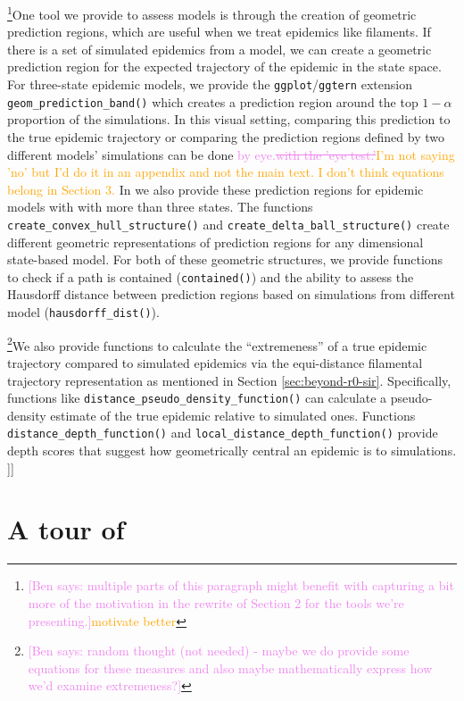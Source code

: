 \documentclass[
  shortnames]{jss}
\begin{document}
\footnote{\textcolor{violet}{[Ben says: multiple parts of this paragraph might benefit with capturing a bit more of the motivation in the rewrite of Section 2 for the tools we're presenting.]}\textcolor{orange}{motivate better}}One
tool we provide to assess models is through the creation of geometric
prediction regions, which are useful when we treat epidemics like
filaments. If there is a set of simulated epidemics from a model, we can
create a geometric prediction region for the expected trajectory of the
epidemic in the state space. For three-state epidemic models, we provide
the \texttt{ggplot}/\texttt{ggtern} extension
\texttt{geom\_prediction\_band()} which creates a prediction region
around the top \(1-\alpha\) proportion of the simulations. In this
visual setting, comparing this prediction to the true epidemic
trajectory or comparing the prediction regions defined by two different
models' simulations can be done
\textcolor{violet}{by eye.\sout{with the 'eye test.'}\textcolor{orange}{I'm not saying 'no' but I'd do it in an appendix and not the main text.  I don't think equations belong in Section 3.}}
In  we also provide these prediction regions for
epidemic models with with more than three states. The functions
\texttt{create\_convex\_hull\_structure()} and
\texttt{create\_delta\_ball\_structure()} create different geometric
representations of prediction regions for any dimensional state-based
model. For both of these geometric structures, we provide functions to
check if a path is contained (\texttt{contained()}) and the ability to
assess the Hausdorff distance between prediction regions based on
simulations from different model (\texttt{hausdorff\_dist()}).

\footnote{\textcolor{violet}{[Ben says: random thought (not needed) - maybe we do provide some equations for these measures and also maybe mathematically express how we'd examine extremeness?]}}We
also provide functions to calculate the ``extremeness'' of a true
epidemic trajectory compared to simulated epidemics via the
equi-distance filamental trajectory representation as mentioned in
Section \ref{sec:beyond-r0-sir}. Specifically, functions like
\texttt{distance\_pseudo\_density\_function()} can calculate a
pseudo-density estimate of the true epidemic relative to simulated ones.
Functions \texttt{distance\_depth\_function()} and
\texttt{local\_distance\_depth\_function()} provide depth scores that
suggest how geometrically central an epidemic is to simulations. {]}{]}

\section[Tour]{A tour of }\label{sec:tour}
\end{document}
